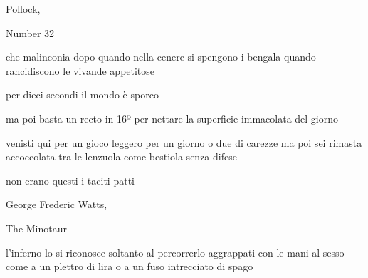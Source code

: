 \clearpage


\begin{artItem}
	Pollock, \begin{otherlanguage}{english}%
		Number 32%
	\end{otherlanguage}
\end{artItem}

\begin{poem}
	\begin{stanza}
		che malinconia dopo\verseline
		quando nella cenere si spengono i bengala\verseline
		quando rancidiscono le vivande appetitose
	\end{stanza}

	\begin{stanza}
		per dieci secondi il mondo è sporco
	\end{stanza}

	\begin{stanza}
		ma poi basta un recto in 16º per nettare\verseline
		la superficie immacolata del giorno
	\end{stanza}
\end{poem}

\clearpage


\begin{poem}
	\begin{stanza}
		venisti qui per un gioco leggero\verseline
		per un giorno o due di carezze\verseline
		ma poi sei rimasta\verseline
		accoccolata tra le lenzuola\verseline
		come bestiola senza difese
	\end{stanza}

	\begin{stanza}
		non erano questi i taciti patti
	\end{stanza}
\end{poem}

\clearpage


\begin{artItem}
	George Frederic Watts, \begin{otherlanguage}{english}%
		The Minotaur%
	\end{otherlanguage}
\end{artItem}

\begin{poem}
	\begin{stanza}
		l'inferno lo si riconosce soltanto\verseline
		al percorrerlo aggrappati\verseline
		con le mani al sesso\verseline
		come a un plettro di lira\verseline
		o a un fuso intrecciato di spago
	\end{stanza}
\end{poem}

